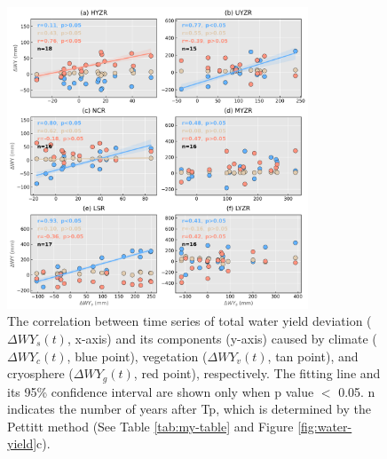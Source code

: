 \documentclass[hess, manuscript]{copernicus}
\begin{document}
\begin{figure}[ht]
    \includegraphics[width=0.8\textwidth]{02-figures/contribution-relations.png}
    \caption{The correlation between time series of total water yield deviation ($\Delta WY_s(t)$, x-axis) and its components (y-axis) caused by climate ($\Delta WY_c(t)$, blue point), vegetation ($\Delta WY_v(t)$, tan point), and cryosphere ($\Delta WY_g(t)$, red point), respectively. The fitting line and its 95\% confidence interval are shown only when p value $<$ 0.05. n indicates the number of years after Tp, which is determined by the Pettitt method (See Table \ref{tab:my-table} and Figure \ref{fig:water-yield}c).}
    \label{fig:attribution-direction}
\end{figure}
\end{document}
